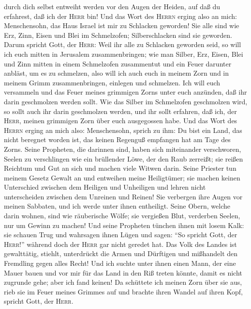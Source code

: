 durch dich selbst entweiht werden vor den Augen der Heiden, auf daß du
erfahrest, daß ich der \textsc{Herr} bin!  Und das Wort
des \textsc{Herrn} erging also an mich:  Menschensohn,
das Haus Israel ist mir zu Schlacken geworden! Sie alle sind wie Erz,
Zinn, Eisen und Blei im Schmelzofen; Silberschlacken sind sie geworden.
 Darum spricht Gott, der \textsc{Herr}: Weil ihr alle zu
Schlacken geworden seid, so will ich euch mitten in Jerusalem
zusammenbringen;  wie man Silber, Erz, Eisen, Blei und
Zinn mitten in einem Schmelzofen zusammentut und ein Feuer darunter
anbläst, um es zu schmelzen, also will ich auch euch in meinem Zorn und
in meinem Grimm zusammenbringen, einlegen und schmelzen. 
Ich will euch versammeln und das Feuer meines grimmigen Zorns unter euch
anzünden, daß ihr darin geschmolzen werden sollt.  Wie
das Silber im Schmelzofen geschmolzen wird, so sollt auch ihr darin
geschmolzen werden, und ihr sollt erfahren, daß ich, der \textsc{Herr},
meinen grimmigen Zorn über euch ausgegossen habe.  Und
das Wort des \textsc{Herrn} erging an mich also: 
Menschensohn, sprich zu ihm: Du bist ein Land, das nicht beregnet worden
ist, das keinen Regenguß empfangen hat am Tage des Zorns.
 Seine Propheten, die darinnen sind, haben sich
miteinander verschworen, Seelen zu verschlingen wie ein brüllender Löwe,
der den Raub zerreißt; sie reißen Reichtum und Gut an sich und machen
viele Witwen darin.  Seine Priester tun meinem Gesetz
Gewalt an und entweihen meine Heiligtümer; sie machen keinen Unterschied
zwischen dem Heiligen und Unheiligen und lehren nicht unterscheiden
zwischen dem Unreinen und Reinen! Sie verbergen ihre Augen vor meinen
Sabbaten, und ich werde unter ihnen entheiligt.  Seine
Obern, welche darin wohnen, sind wie räuberische Wölfe; sie vergießen
Blut, verderben Seelen, nur um Gewinn zu machen!  Und
seine Propheten tünchen ihnen mit losem Kalk: sie schauen Trug und
wahrsagen ihnen Lügen und sagen: ``So spricht Gott, der \textsc{Herr}!''
während doch der \textsc{Herr} gar nicht geredet hat. 
Das Volk des Landes ist gewalttätig, stiehlt, unterdrückt die Armen und
Dürftigen und mißhandelt den Fremdling gegen alles Recht!
 Und ich suchte unter ihnen einen Mann, der eine Mauer
bauen und vor mir für das Land in den Riß treten könnte, damit es nicht
zugrunde gehe; aber ich fand keinen!  Da schüttete ich
meinen Zorn über sie aus, rieb sie im Feuer meines Grimmes auf und
brachte ihren Wandel auf ihren Kopf, spricht Gott, der \textsc{Herr}.

